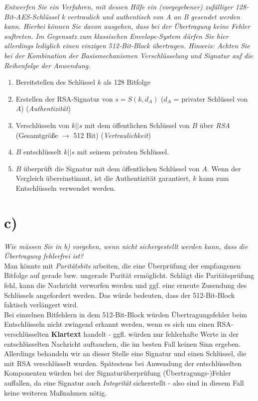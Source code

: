 \textit{Entwerfen Sie ein Verfahren, mit dessen Hilfe ein (vorgegebener) zufälliger 128‐
Bit‐AES‐Schlüssel k vertraulich und authentisch von A an B gesendet werden
kann. Hierbei können Sie davon ausgehen, dass bei der Übertragung keine Fehler
auftreten. Im Gegensatz zum klassischen Envelope‐System dürfen Sie hier allerdings lediglich einen einzigen 512‐Bit‐Block übertragen.
Hinweis: Achten Sie bei der Kombination der Basismechanismen Verschlüsselung und Signatur auf die Reihenfolge der Anwendung.}\\

\noindent

\begin{enumerate}
    \itemsep0.5em
    \item Bereitstellen des Schlüssel $k$ als 128 Bitfolge
    \item Erstellen der RSA-Signatur von $s= S(k, d_A)$ ($d_A$ = privater Schlüssel von $A$) (\textit{Authentizität})
    \item Verschlüsseln von $k||s$ mit dem öffentlichen Schlüssel von $B$ über \textit{RSA} (Gesamtgröße $\rightarrow$ 512 Bit) (\textit{Vertraulichkeit})
    \item $B$ entschlüsselt $k||s$  mit seinem privaten Schlüssel.
    \item $B$ überprüft die Signatur mit dem öffentlichen Schlüssel von $A$.
    Wenn der Vergleich übereinstimmt, ist die Authentizität garantiert, $k$ kann zum Entschlüsseln verwendet werden.
\end{enumerate}


\section{c)}

\textit{Wie müssen Sie in b) vorgehen, wenn nicht sichergestellt werden kann, dass die
Übertragung fehlerfrei ist?}\\

\noindent
Man könnte mit \textit{Paritätsbits} arbeiten, die eine Überprüfung der empfangenen Bitfolge auf gerade bzw. ungerade Parität ermöglicht.
Schlägt die Paritätsprüfung fehl, kann die Nachricht verworfen werden und ggf. eine erneute Zusendung des Schlüssels angefordert werden.
Das würde bedeuten, dass der 512-Bit-Block faktisch verlängert wird.\\

\noindent
Bei einzelnen Bitfehlern in dem 512-Bit-Block würden Übertragungsfehler beim Entschlüsseln nicht zwingend erkannt werden, wenn es sich um einen RSA-verschlüsselten \textbf{Klartext} handelt - ggfl. würden nur fehlerhafte Werte in der entschlüsselten Nachricht auftauchen, die im besten Fall keinen Sinn ergeben.\\
Allerdings behandeln wir an dieser Stelle eine Signatur und einen Schlüssel, die mit RSA verschlüsselt wurden.
Spätestens bei Anwendung der entschlüsselten Komponenten würden bei der Signaturüberprüfung  (Übertragungs-)Fehler auffallen, da eine Signatur auch \textit{Integrität} sicherstellt - also sind in diesem Fall keine weiteren Maßnahmen nötig.